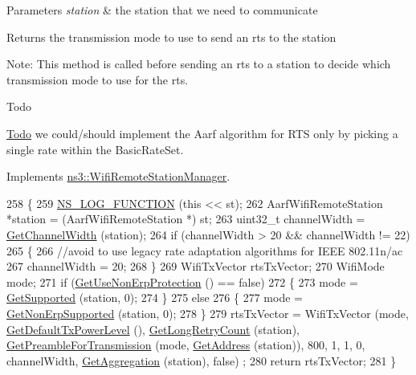 \begin{DoxyParams}{Parameters}
{\em station} & the station that we need to communicate\\
\hline
\end{DoxyParams}
\begin{DoxyReturn}{Returns}
the transmission mode to use to send an rts to the station
\end{DoxyReturn}
Note\+: This method is called before sending an rts to a station to decide which transmission mode to use for the rts. \begin{DoxyRefDesc}{Todo}
\item[\hyperlink{todo__todo000166}{Todo}]we could/should implement the Aarf algorithm for R\+TS only by picking a single rate within the Basic\+Rate\+Set. \end{DoxyRefDesc}


Implements \hyperlink{classns3_1_1WifiRemoteStationManager_abf44eccb31d4b1b58644fd6721d132c9}{ns3\+::\+Wifi\+Remote\+Station\+Manager}.


\begin{DoxyCode}
258 \{
259   \hyperlink{log-macros-disabled_8h_a90b90d5bad1f39cb1b64923ea94c0761}{NS\_LOG\_FUNCTION} (\textcolor{keyword}{this} << st);
262   AarfWifiRemoteStation *station = (AarfWifiRemoteStation *) st;
263   uint32\_t channelWidth = \hyperlink{classns3_1_1WifiRemoteStationManager_a918213c5b9fa629c4986f6d90521bbd4}{GetChannelWidth} (station);
264   \textcolor{keywordflow}{if} (channelWidth > 20 && channelWidth != 22)
265     \{
266       \textcolor{comment}{//avoid to use legacy rate adaptation algorithms for IEEE 802.11n/ac}
267       channelWidth = 20;
268     \}
269   WifiTxVector rtsTxVector;
270   WifiMode mode;
271   \textcolor{keywordflow}{if} (\hyperlink{classns3_1_1WifiRemoteStationManager_a2d3d93f08995e554960a177a52f90f2f}{GetUseNonErpProtection} () == \textcolor{keyword}{false})
272     \{
273       mode = \hyperlink{classns3_1_1WifiRemoteStationManager_a995c8bae0d84b168fd3e8bc9ecaacdd4}{GetSupported} (station, 0);
274     \}
275   \textcolor{keywordflow}{else}
276     \{
277       mode = \hyperlink{classns3_1_1WifiRemoteStationManager_a3df8f1931f1fce653e5990a2821b44c6}{GetNonErpSupported} (station, 0);
278     \}
279   rtsTxVector = WifiTxVector (mode, \hyperlink{classns3_1_1WifiRemoteStationManager_acff2fc859ee6b4c66ea7a83dd075b5d6}{GetDefaultTxPowerLevel} (), 
      \hyperlink{classns3_1_1WifiRemoteStationManager_aac10b1403fb0bd670f8a8bd6d7e48304}{GetLongRetryCount} (station), \hyperlink{classns3_1_1WifiRemoteStationManager_a0f44967cbd7488baada4802ebc642110}{GetPreambleForTransmission} (mode, 
      \hyperlink{classns3_1_1WifiRemoteStationManager_ac9ccc8c514bd8d2af05c290e63461a2a}{GetAddress} (station)), 800, 1, 1, 0, channelWidth, \hyperlink{classns3_1_1WifiRemoteStationManager_a5421c8d510cb16eebeac9f2ea9dd73c3}{GetAggregation} (station), \textcolor{keyword}{false})
      ;
280   \textcolor{keywordflow}{return} rtsTxVector;
281 \}
\end{DoxyCode}


